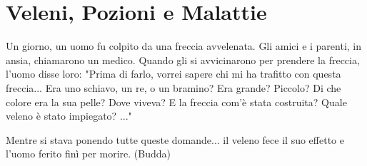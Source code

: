 \section{Veleni, Pozioni e Malattie}

\label{veleni-e-pozioni}


\begin{changemargin}{0.3cm}{0.3cm}\begin{enfasi}{
Un giorno, un uomo fu colpito da una freccia avvelenata. Gli amici e i parenti, in ansia, chiamarono un medico. Quando gli si avvicinarono per prendere la freccia, l'uomo disse loro: "Prima di farlo, vorrei sapere chi mi ha trafitto con questa freccia... Era uno schiavo, un re, o un bramino? Era grande? Piccolo? Di che colore era la sua pelle? Dove viveva? E la freccia com'è stata costruita? Quale veleno è stato impiegato? ..."

Mentre si stava ponendo tutte queste domande... il veleno fece il suo effetto e l'uomo ferito finì per morire. (Budda)}\end{enfasi}\end{changemargin}\medskip

